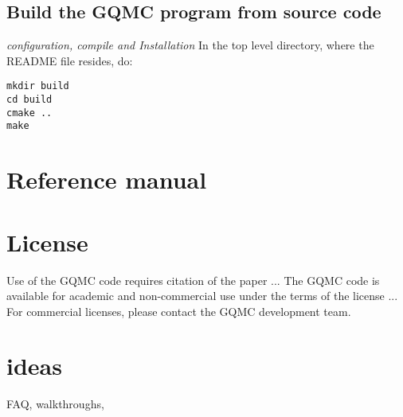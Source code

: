 \documentclass[10pt,Arial]{article}
\begin{document}
\subsection{Build the GQMC program from source code}
\textit{configuration, compile and Installation}
In the top level directory, where the README file resides, do:
\begin{verbatim}
mkdir build
cd build
cmake ..
make
\end{verbatim}
  
\section{Reference manual}
\section{License}
Use of the GQMC code requires citation of the paper ...
The GQMC code is available for academic and non-commercial use under the terms of the license ...
For commercial licenses, please contact the GQMC development team. 

\section{ideas}
FAQ, walkthroughs,
\end{document}
